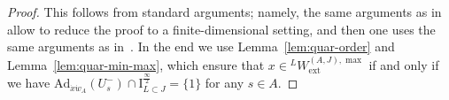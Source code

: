 \documentclass[11pt]{amsart}
\numberwithin{equation}{section}
\theoremstyle{plain}
\theoremstyle{definition}
\newcommand{\sC}{{\mathcal C}}
\newcommand{\I}{{\mathrm I}}
\renewcommand{\k}{\Bbbk}
\newcommand{\sL}{{\mathcal L}}
\newcommand{\X}{{\mathbb X}}
\newcommand{\Xd}{\check{\X}}
\newcommand{\Z}{{\mathbb Z}}
\newcommand{\Vect}{\mathsf{Vect}}
\newcommand{\Ad}{\mathrm{Ad}}
\newcommand{\semi}{{{\frac{\infty}{2}}}}
\newcommand{\quar}{{{\frac{\infty}{4}}}}
\newcommand{\Phis}{\Phi^{\mathrm{s}}}
\newcommand{\ex}{\mathrm{ext}}
\newcommand{\Shv}{\mathsf{Shv}}
\newcommand{\comp}{\mathrm{c}}
\begin{document}
\begin{proof}
This follows from standard arguments; namely, the same arguments as in~\cite[Proposition~1.3.5]{Gaits18} allow to reduce the proof to a finite-dimensional setting, and then one uses the same arguments as in~\cite[Lemma~4.2.1]{by}. In the end we use Lemma~\ref{lem:quar-order} and Lemma~\ref{lem:quar-min-max}, which ensure that $x \in {}^L W_\ex^{(A,J),\max}$ if and only if we have $\Ad_{\dot{x}\dot{w}_A}(U_s^-) \cap \I_{L \subset J}^{\semi} = \{1\}$ for any $s \in A$.
\end{proof}
\end{document}

